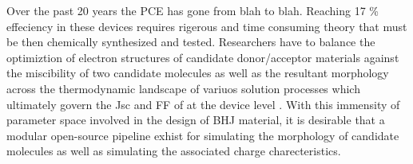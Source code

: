 Over the past 20 years the PCE has gone from blah to blah. Reaching 17 \% effeciency in these devices requires
rigerous and time consuming theory that must be then chemically synthesized and tested. Researchers have to
balance the optimiztion of electron structures of candidate donor/acceptor materials against the miscibility
of two candidate molecules as well as the resultant morphology across the thermodynamic landscape of
variuos solution processes which ultimately govern the Jsc and FF of at the device level \cite{Zhu2020a}. 
With this immensity of parameter space involved in the design of BHJ material, it is desirable that a modular
open-source pipeline exhist for simulating the morphology of candidate molecules as well as simulating the 
associated charge charecteristics. 
